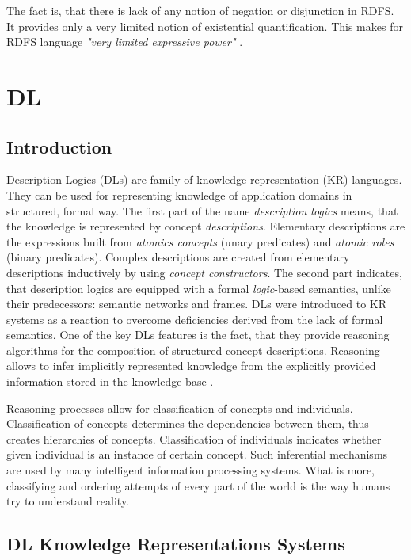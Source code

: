 \medskip

\noindent The fact is, that there is lack of any notion of negation or disjunction in RDFS. It provides only a very limited notion of existential quantification. This makes for RDFS language \textit{"very limited expressive power"} \cite{HLP08}.

\newpage

\section{DL}
\label{sec:dl}

\subsection{Introduction}
\label{sub:DLIntroduction}

Description Logics (DLs) are family of knowledge representation (KR) languages. They can be used for representing knowledge of application domains in structured, formal way. The first part of the name \textit{description logics} means, that the knowledge is represented by concept \textit{descriptions}. Elementary descriptions are the expressions built from \textit{atomics concepts} (unary predicates) and \textit{atomic roles} (binary predicates). Complex descriptions are created from elementary descriptions inductively by using \textit{concept constructors}. The second part indicates, that description logics are equipped with a formal \textit{logic}-based semantics, unlike their predecessors: semantic networks and frames. DLs were introduced to KR systems as a reaction to overcome deficiencies derived from the lack of formal semantics. One of the key DLs features is the fact, that they provide reasoning algorithms for the composition of structured concept descriptions. Reasoning allows to infer implicitly represented knowledge from the explicitly provided information stored in the knowledge base \cite{BCM03, Hor97, HLP08}.

Reasoning processes allow for classification of concepts and individuals. Classification of concepts determines the dependencies between them, thus creates hierarchies of concepts. Classification of individuals indicates whether given individual is an instance of certain concept. Such inferential mechanisms are used by many intelligent information processing systems. What is more, classifying and ordering attempts of every part of the world is the way humans try to understand reality.

\subsection{DL Knowledge Representations Systems}
\label{sub:DLKRSs}

